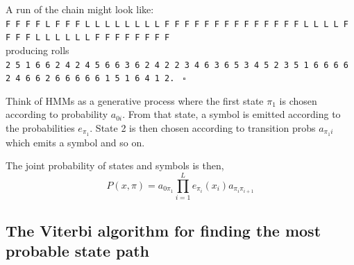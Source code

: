 \documentclass[11pt]{article}
\newcommand{\sqend}{\hfill $\square$}
\begin{document}
\begin{figure}[htbp]
\begin{center}
\end{center}
\caption{}
\end{figure}


A run of the chain might look like:\\ {\tt F F F F L F F F L L L L L L L L F F F F F F F F F F F F F F L L L L F F F F L L L L L L F F F F F F F F}\\
producing  rolls  \\
{\tt 2 5 1 6 6 2 4 2 4 5 6 6 3 6 2 4 2 2 3 4 6 3 6 5 3 4 5 2 3 5 1 6 6 6 6 2 4 6 6 2 6 6 6 6 6 1 5 1 6 4 1 2. } \sqend

Think of HMMs as a generative process where the first state $\pi_1$ is chosen according to probability $a_{0i}$.  From that state, a symbol is emitted according to the probabilities $e_{\pi_1}$.  State 2 is then chosen according to transition probs $a_{\pi_1  i}$ which emits a symbol and so on. 

 The joint probability of states and symbols is then, 
 \[ P(x,\pi) = a_{0 \pi_1} \prod_{i = 1}^L e_{\pi_i}(x_i)a_{\pi_i \pi_{i+1}} \]



\subsection{The Viterbi algorithm for finding the most probable state path}
\end{document}
